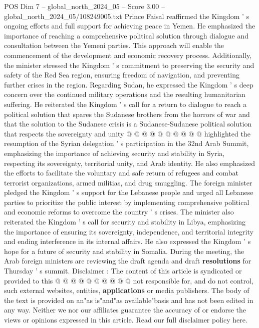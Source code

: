 \begin{textsample}{POS Dim 7 – global\_north\_2024\_05 – Score 3.00 – global\_north\_2024\_05/108249005.txt}
Prince Faisal reaffirmed the Kingdom ' s ongoing efforts and full support for achieving peace in Yemen.
He emphasized the importance of reaching a comprehensive political solution through dialogue and consultation between the Yemeni parties.
This approach will enable the commencement of the development and economic recovery process.
Additionally, the minister stressed the Kingdom ' s commitment to preserving the security and safety of the Red Sea region, ensuring freedom of navigation, and preventing further crises in the region.
Regarding Sudan, he expressed the Kingdom ' s deep concern over the continued military operations and the resulting humanitarian suffering.
He reiterated the Kingdom ' s call for a return to dialogue to reach a political solution that spares the Sudanese brothers from the horrors of war and that the solution to the Sudanese crisis is a Sudanese-Sudanese political solution that respects the sovereignty and unity @ @ @ @ @ @ @ @ @ @ highlighted the resumption of the Syrian delegation ' s participation in the 32nd Arab Summit, emphasizing the importance of achieving security and stability in Syria, respecting its sovereignty, territorial unity, and Arab identity.
He also emphasized the efforts to facilitate the voluntary and safe return of refugees and combat terrorist organizations, armed militias, and drug smuggling.
The foreign minister pledged the Kingdom ' s support for the Lebanese people and urged all Lebanese parties to prioritize the public interest by implementing comprehensive political and economic reforms to overcome the country ' s crises.
The minister also reiterated the Kingdom ' s call for security and stability in Libya, emphasizing the importance of ensuring its sovereignty, independence, and territorial integrity and ending interference in its internal affairs.
He also expressed the Kingdom ' s hope for a future of security and stability in Somalia.
During the meeting, the Arab foreign ministers are reviewing the draft agenda and draft \textbf{resolutions} for Thursday ' s summit.
Disclaimer : The content of this article is syndicated or provided to this @ @ @ @ @ @ @ @ @ @ not responsible for, and do not control, such external websites, entities, \textbf{applications} or media publishers.
The body of the text is provided on an"as is"and"as available"basis and has not been edited in any way.
Neither we nor our affiliates guarantee the accuracy of or endorse the views or opinions expressed in this article.
Read our full disclaimer policy here.

\end{textsample}
